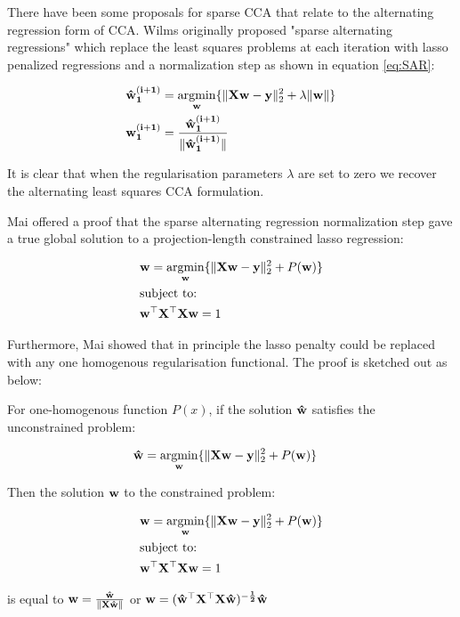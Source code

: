There have been some proposals for sparse CCA that relate to the alternating regression form of CCA. Wilms originally proposed "sparse alternating regressions" \cite{wilms2015sparse} which replace the least squares problems at each iteration with lasso penalized regressions and a normalization step as shown in equation \ref{eq:SAR}:

\begin{align}\label{eq:SAR}
    & \bold{\hat{w}^{(i+1)}_1}=\underset{\bold{w}}{\mathrm{argmin}}\{ \|\bold{Xw-y}\|^2_2 + \lambda\|\bold{w}\| \}\\
    & \bold{w^{(i+1)}_1}=\bold{\frac{\hat{w}^{(i+1)}_1}{\|\hat{w}^{(i+1)}_1\|}}
\end{align}

It is clear that when the regularisation parameters $\lambda$ are set to zero we recover the alternating least squares CCA formulation. 

Mai offered a proof that the sparse alternating regression normalization step gave a true global solution to a projection-length constrained lasso regression\cite{mai2019iterative}:

\begin{align}
    & \bold{w}=\underset{\bold{w}}{\mathrm{argmin}}\{ \|\bold{Xw-y}\|^2_2 + P(\bold{w}) \}\\
    & \text{subject to:} \notag\\
    & \bold{w^{\top}X^{\top}Xw}=1 \notag
\end{align}

Furthermore, Mai showed that in principle the lasso penalty could be replaced with any one homogenous regularisation functional. The proof is sketched out as below:

\begin{thm}

For one-homogenous function $P(x)$, if the solution $\bold{\hat{w}}$ satisfies the unconstrained problem:

\begin{align}
    & \bold{\hat{w}}=\underset{\bold{w}}{\mathrm{argmin}}\{ \|\bold{Xw-y}\|^2_2 + P(\bold{w}) \}
\end{align}

Then the solution $\bold{w}$ to the constrained problem: 

\begin{align}
    & \bold{w}=\underset{\bold{w}}{\mathrm{argmin}}\{ \|\bold{Xw-y}\|^2_2 + P(\bold{w}) \}\\
    & \text{subject to:} \notag\\
    & \bold{w^{\top}X^{\top}Xw}=1 \notag
\end{align}

is equal to $\bold{w}=\bold{\frac{\hat{w}}{\|X\hat{w}\|}}$ or $\bold{w}=\bold{(\hat{w}^{\top}X^{\top}X\hat{w})^{-\frac{1}{2}}\hat{w}}$

\end{thm}

